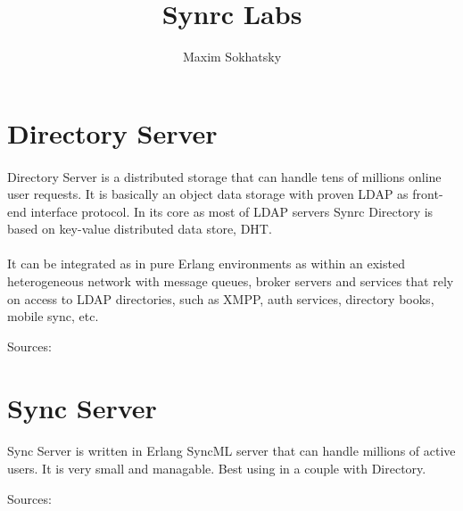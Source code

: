 \documentclass[11pt]{article}
\begin{document}

\title{Synrc Labs}
\author{Maxim Sokhatsky}


\section*{Directory Server}
\paragraph{}
Directory Server is a distributed storage that can handle tens of
millions online user requests. It is basically an object data storage
with proven LDAP as front-end interface protocol.
In its core as most of LDAP servers Synrc Directory is based on
key-value distributed data store, DHT.
\paragraph{}
It can be integrated as in pure Erlang environments as within an
existed heterogeneous network with message queues, broker servers
and services that rely on access to LDAP directories, such as XMPP,
auth services, directory books, mobile sync, etc.

Sources: 


\section*{Sync Server}
\paragraph{}
Sync Server is written in Erlang SyncML server that can handle
millions of active users. It is very small and managable.
Best using in a couple with Directory.

Sources: 
\end{document}
